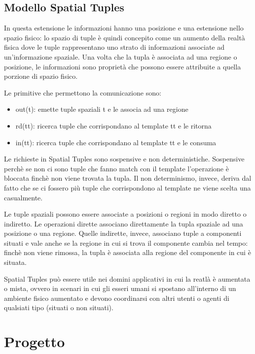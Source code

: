 \documentclass[12pt,a4paper,openright,twoside]{report}
\begin{document}
\section{Modello Spatial Tuples}\label{ModelloSpatialTuples}
In questa estensione le informazioni hanno una posizione e una estensione nello spazio fisico: lo spazio di tuple \`e quindi concepito come un aumento della realt\`a fisica dove le tuple rappresentano uno strato di informazioni associate ad un'informazione spaziale.
Una volta che la tupla \`e associata ad una regione o posizione, le informazioni sono propriet\`a che possono essere attribuite a quella porzione di spazio fisico.

Le primitive che permettono la comunicazione sono:
\begin{itemize}
   \item out(t): emette tuple spaziali t e le associa ad una regione
   \item rd(tt): ricerca tuple che corrispondano al template tt e le ritorna
   \item in(tt): ricerca tuple che corrispondano al template tt e le consuma
\end{itemize}

Le richieste in Spatial Tuples sono sospensive e non deterministiche. Sospensive perch\`e se non ci sono tuple che fanno match con il template l'operazione \`e bloccata finch\`e non viene trovata la tupla. Il non determinismo, invece, deriva dal fatto che se ci fossero pi\`u tuple che corrispondono al template ne viene scelta una casualmente.

Le tuple spaziali possono essere associate a posizioni o regioni in modo diretto o indiretto. Le operazioni dirette associano direttamente la tupla spaziale ad una posizione o una regione. Quelle indirette, invece, associano tuple a componenti situati e vale anche se la regione in cui si trova il componente cambia nel tempo: finch\`e non viene rimossa, la tupla \`e associata alla regione del componente in cui \`e situata.

Spatial Tuples pu\`o essere utile nei domini applicativi in cui la reatl\`a \`e aumentata o mista, ovvero in scenari in cui gli esseri umani si spostano all'interno di un ambiente fisico aumentato e devono coordinarsi con altri utenti o agenti di qualsiati tipo (situati o non situati).

\chapter{Progetto}
\lhead[\fancyplain{}{\bfseries\thepage}]{\fancyplain{}{\bfseries\rightmark}}
\end{document}
